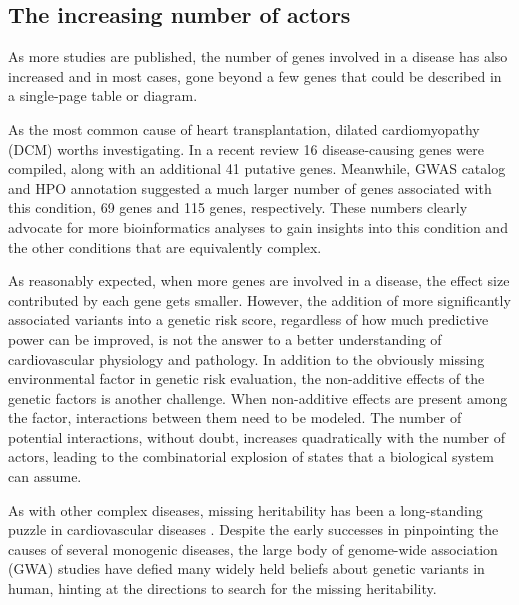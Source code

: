 \documentclass[letter]{bioinfo}
\begin{document}
\subsection{The increasing number of actors}

As more studies are published, the number of genes involved in a disease has also increased and in most cases, gone beyond a few genes that could be described in a single-page table or diagram.


As the most common cause of heart transplantation, dilated cardiomyopathy (DCM) worths investigating. In a recent review \citep{Burke:2016:Clinical} 16 disease-causing genes were compiled, along with an additional 41 putative genes. Meanwhile, GWAS catalog and HPO annotation suggested a much larger number of genes associated with this condition, 69 genes and 115 genes, respectively. These numbers clearly advocate for more bioinformatics analyses to gain insights into this condition and the other conditions that are equivalently complex.

As reasonably expected, when more genes are involved in a disease, the effect size contributed by each gene gets smaller. However, the addition of more significantly associated variants into a genetic risk score, regardless of how much predictive power can be improved, is not the answer to a better understanding of cardiovascular physiology and pathology. In addition to the obviously missing environmental factor in genetic risk evaluation, the non-additive effects of the genetic factors is another challenge. When non-additive effects are present among the factor, interactions between them need to be modeled. The number of potential interactions, without doubt, increases quadratically with the number of actors, leading to the combinatorial explosion of states that a biological system can assume.


As with other complex diseases, missing heritability has been a long-standing puzzle in cardiovascular diseases \citep{Manolio:2009:Finding}. Despite the early successes in pinpointing the causes of several monogenic diseases, the large body of genome-wide association (GWA) studies have defied many widely held beliefs about genetic variants in human, hinting at the directions to search for the missing heritability.
\end{document}
